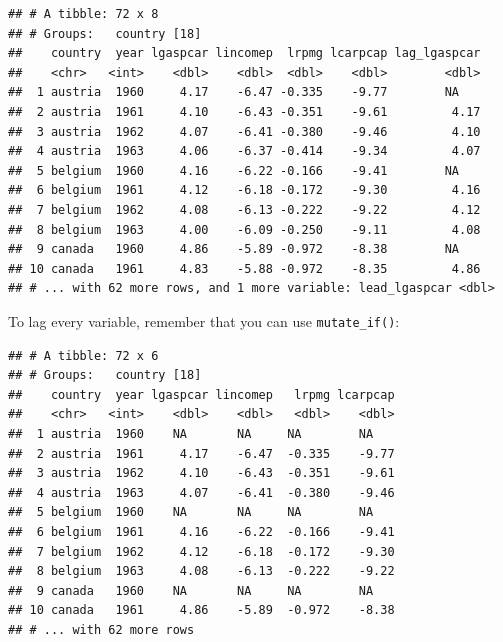 \documentclass[]{gitbook}
\newenvironment{Shaded}{\begin{snugshade}}{\end{snugshade}}
\newcommand{\DecValTok}[1]{\textcolor[rgb]{0.00,0.00,0.81}{#1}}
\newcommand{\KeywordTok}[1]{\textcolor[rgb]{0.13,0.29,0.53}{\textbf{#1}}}
\newcommand{\NormalTok}[1]{#1}
\newcommand{\OperatorTok}[1]{\textcolor[rgb]{0.81,0.36,0.00}{\textbf{#1}}}
\newcommand{\StringTok}[1]{\textcolor[rgb]{0.31,0.60,0.02}{#1}}
\theoremstyle{definition}
\theoremstyle{definition}
\theoremstyle{definition}
\theoremstyle{remark}
\begin{document}
\begin{verbatim}
## # A tibble: 72 x 8
## # Groups:   country [18]
##    country  year lgaspcar lincomep  lrpmg lcarpcap lag_lgaspcar
##    <chr>   <int>    <dbl>    <dbl>  <dbl>    <dbl>        <dbl>
##  1 austria  1960     4.17    -6.47 -0.335    -9.77        NA   
##  2 austria  1961     4.10    -6.43 -0.351    -9.61         4.17
##  3 austria  1962     4.07    -6.41 -0.380    -9.46         4.10
##  4 austria  1963     4.06    -6.37 -0.414    -9.34         4.07
##  5 belgium  1960     4.16    -6.22 -0.166    -9.41        NA   
##  6 belgium  1961     4.12    -6.18 -0.172    -9.30         4.16
##  7 belgium  1962     4.08    -6.13 -0.222    -9.22         4.12
##  8 belgium  1963     4.00    -6.09 -0.250    -9.11         4.08
##  9 canada   1960     4.86    -5.89 -0.972    -8.38        NA   
## 10 canada   1961     4.83    -5.88 -0.972    -8.35         4.86
## # ... with 62 more rows, and 1 more variable: lead_lgaspcar <dbl>
\end{verbatim}

To lag every variable, remember that you can use \texttt{mutate\_if()}:

\begin{Shaded}
\end{Shaded}

\begin{verbatim}
## # A tibble: 72 x 6
## # Groups:   country [18]
##    country  year lgaspcar lincomep   lrpmg lcarpcap
##    <chr>   <int>    <dbl>    <dbl>   <dbl>    <dbl>
##  1 austria  1960    NA       NA     NA        NA   
##  2 austria  1961     4.17    -6.47  -0.335    -9.77
##  3 austria  1962     4.10    -6.43  -0.351    -9.61
##  4 austria  1963     4.07    -6.41  -0.380    -9.46
##  5 belgium  1960    NA       NA     NA        NA   
##  6 belgium  1961     4.16    -6.22  -0.166    -9.41
##  7 belgium  1962     4.12    -6.18  -0.172    -9.30
##  8 belgium  1963     4.08    -6.13  -0.222    -9.22
##  9 canada   1960    NA       NA     NA        NA   
## 10 canada   1961     4.86    -5.89  -0.972    -8.38
## # ... with 62 more rows
\end{verbatim}
\end{document}
